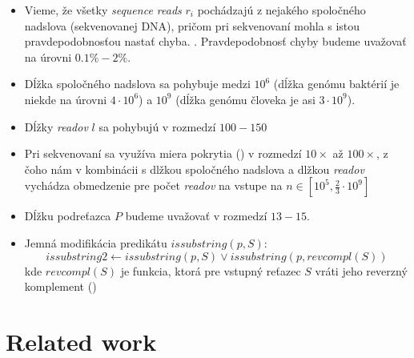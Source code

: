 \begin{itemize}
    \item Vieme, že všetky \emph{sequence reads} $r_i$ pochádzajú z nejakého
    spoločného nadslova (sekvenovanej DNA), pričom pri sekvenovaní mohla s
    istou pravdepodobnosťou nastať chyba. . Pravdepodobnosť chyby budeme uvažovať na úrovni $0.1\% - 2\% $.
    \item Dĺžka spoločného nadslova sa pohybuje medzi $10^6$ (dĺžka genómu
    baktérií je niekde na úrovni $4 \cdot 10^6$) a $10^9$ (dĺžka genómu človeka
    je asi $3 \cdot 10^9$).
    \item Dĺžky \emph{readov} $l$ sa pohybujú v rozmedzí $100 - 150$
    \item Pri sekvenovaní sa využíva miera pokrytia () v rozmedzí $10\times$ až $100\times$, z čoho nám v
    kombinácii s dlžkou spoločného nadslova a dlžkou \emph{readov} vychádza
    obmedzenie pre počet \emph{readov} na vstupe na 
    $n \in [ 10^5, \frac{2}{3} \cdot 10^9 ]$ 
    \item Dĺžku podreťazca $P$ budeme uvažovať v rozmedzí $13 -15$. 
    \item Jemná modifikácia predikátu $issubstring(p, S)$: $$issubstring2
    \leftarrow issubstring(p, S) \vee issubstring(p, revcompl(S))$$ kde
    $revcompl(S)$ je funkcia, ktorá pre vstupný reťazec $S$ vráti jeho reverzný
    komplement ()
\end{itemize}



\section{Related work}
